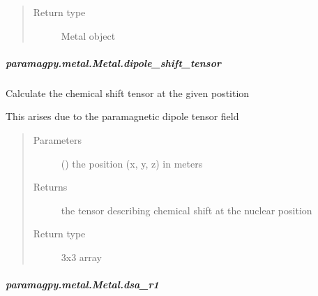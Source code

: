\documentclass[a4paper,10pt,english]{sphinxmanual}
\begin{document}
\begin{fulllineitems}
\begin{fulllineitems}
\begin{fulllineitems}
\begin{quote}
\begin{description}
\item[{Return type}] \leavevmode
Metal object

\end{description}\end{quote}

\end{fulllineitems}



\subparagraph{paramagpy.metal.Metal.dipole\_shift\_tensor}
\label{\detokenize{reference/generated/paramagpy.metal.Metal.dipole_shift_tensor:paramagpy-metal-metal-dipole-shift-tensor}}\label{\detokenize{reference/generated/paramagpy.metal.Metal.dipole_shift_tensor::doc}}

\begin{fulllineitems}
\label{\detokenize{reference/generated/paramagpy.metal.Metal.dipole_shift_tensor:paramagpy.metal.Metal.dipole_shift_tensor}}
Calculate the chemical shift tensor at the given postition

This arises due to the paramagnetic dipole tensor field
\begin{quote}\begin{description}
\item[{Parameters}] \leavevmode
{} () \textendash{} the position (x, y, z) in meters

\item[{Returns}] \leavevmode
{} \textendash{} the tensor describing chemical shift at the nuclear position

\item[{Return type}] \leavevmode
3x3 array

\end{description}\end{quote}

\end{fulllineitems}



\subparagraph{paramagpy.metal.Metal.dsa\_r1}
\label{\detokenize{reference/generated/paramagpy.metal.Metal.dsa_r1:paramagpy-metal-metal-dsa-r1}}\label{\detokenize{reference/generated/paramagpy.metal.Metal.dsa_r1::doc}}


\end{fulllineitems}
\end{fulllineitems}
\end{document}
